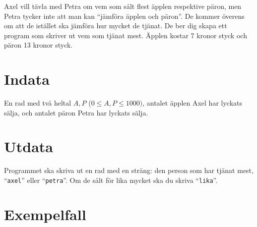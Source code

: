 
Axel vill tävla med Petra om vem som sålt flest äpplen respektive päron, men Petra tycker inte att man kan ``jämföra äpplen och päron''. De kommer överens om att de istället ska jämföra hur mycket de tjänat. De ber dig skapa ett program som skriver ut vem som tjänat mest. Äpplen kostar 7 kronor styck och päron 13 kronor styck.

\section*{Indata}
En rad med två heltal $A,P$ ($0 \le A,P \le 1000)$, antalet äpplen Axel har lyckats sälja, och antalet päron Petra har lyckats sälja. 

\section*{Utdata}
Programmet ska skriva ut en rad med en sträng: den person som har tjänat mest, ``\texttt{axel}'' eller ``\texttt{petra}''. Om de sålt för lika mycket ska du skriva ``\texttt{lika}''.


\section*{Exempelfall}
